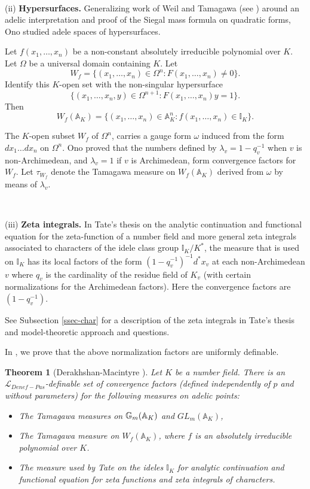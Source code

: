 \documentclass[12pt]{amsart}
\def\A{\mathbb{A}}
\def\I{\mathbb{I}}
\def\cL{\mathcal{L}}
\def\cL{\mathcal{L}}
\newtheorem{thm}{Theorem}[section]
\numberwithin{equation}{section}
\begin{document}
\

(ii) {\bf Hypersurfaces.} Generalizing work of Weil and Tamagawa (see \cite{weil-adeles-gps})
around an adelic interpretation and proof of the Siegal mass formula on quadratic forms, 
Ono \cite{ono-int} studied adele spaces of hypersurfaces. 

Let $f(x_1,\dots,x_n)$ be a non-constant absolutely irreducible polynomial over $K$. 
Let $\Omega$ be a universal domain containing $K$. Let 
$$W_f=\{(x_1,\dots,x_n)\in \Omega^n: F(x_1,\dots,x_n)\neq 0\}.$$
Identify this $K$-open set with the non-singular hypersurface 
$$\{(x_1,\dots,x_n,y)\in \Omega^{n+1}: F(x_1,\dots,x_n)y=1\}.$$
Then 
$$W_f(\A_K)=\{(x_1,\dots,x_n) \in \A_K^n: f(x_1,\dots,x_n)\in \I_K\}.$$

The $K$-open subset $W_f$ of $\Omega^n$, carries a gauge form $\omega$ induced from the 
form $dx_1\dots dx_n$ on $\Omega^n$. Ono \cite{ono-int} proved that the numbers defined by $\lambda_v=1-q_v^{-1}$ when $v$ is non-Archimedean, and $\lambda_v=1$ if $v$ is Archimedean, form convergence factors for $W_f$. Let $\tau_{W_f}$ denote  the Tamagawa measure on $W_f(\A_K)$ derived from $\omega$ by means of $\lambda_v$. 

\

(iii) {\bf Zeta integrals.} In Tate's thesis \cite{tate-thesis} on the analytic continuation and functional equation for the zeta-function of a number field and more general zeta integrals associated to characters of the idele class group $\I_K/K^*$, the measure that is used on $\I_K$ has its local factors of the form $(1-q_v^{-1})^{-1}d^*x_v$ at each non-Archimedean $v$ where $q_v$ is the cardinality of the residue field of $K_v$ (with certain normalizations for the Archimedean factors). Here the convergence factors are $(1-q_v^{-1})$. 

See Subsection \ref{ssec-char} for a description of the zeta integrals in Tate's thesis and model-theoretic approach and questions.

In \cite{DM-ad}, we prove  that the above normalization factors are uniformly definable. 

\begin{thm}[Derakhshan-Macintyre {\cite{DM-ad}}]\label{conv-fac} Let $K$ be a number field. There is an $\cL_{Denef-Pas}$-definable set of convergence factors (defined independently of $p$ and without parameters) for the following measures on adelic points:
\begin{itemize}
\item The Tamagawa measures on $\Bbb G_m(\A_K)$ and $GL_m(\A_K)$,
\item The Tamagawa measure on $W_f(\A_K)$, where $f$ is an absolutely irreducible polynomial over $K$.
\item The measure used by Tate on the ideles $\I_K$ for analytic continuation and functional equation for zeta functions and zeta integrals of characters.\end{itemize}\end{thm}
\end{document}
